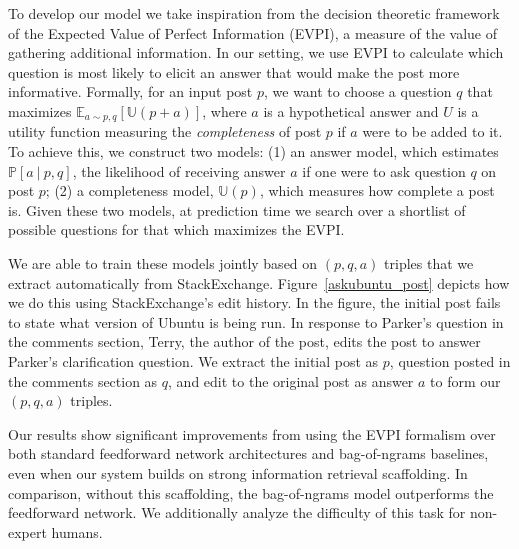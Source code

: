 \documentclass[11pt,a4paper]{article}
\newcommand{\U}{\mathbb{U}}
\begin{document}
To develop our model we take inspiration from the decision theoretic framework of the Expected Value of Perfect Information (EVPI), a measure of the value of gathering additional information. In our setting, we use EVPI to calculate which question is most likely to elicit an answer that would make the post more informative.
Formally, for an input post $p$, we want to choose a question $q$ that maximizes $\mathbb{E}_{a \sim p,q}[\U(p+a)]$, where $a$ is a hypothetical answer and $U$ is a utility function measuring the \emph{completeness} of post $p$ if $a$ were to be added to it.
To achieve this, we construct two models:
(1) an answer model, which estimates $\mathbb{P}[a~|~p,q]$, the likelihood of receiving answer $a$ if one were to ask question $q$ on post $p$;
(2) a completeness model, $\U(p)$, which measures how complete a post is.
Given these two models, at prediction time we search over a shortlist of possible questions for that which maximizes the EVPI.

We are able to train these models jointly based on $(p,q,a)$ triples that we extract automatically from StackExchange.
Figure~\ref{askubuntu_post} depicts how we do this using StackExchange's edit history.  In the figure, the initial post fails to state what version of Ubuntu is being run. In response to Parker's question in the comments section, Terry, the author of the post, edits the post to answer Parker's clarification question. We extract the initial post as $p$, question posted in the comments section as $q$, and edit to the original post as answer $a$ to form our $(p,q,a)$ triples. 

Our results show significant improvements from using the EVPI formalism over both standard feedforward network architectures and bag-of-ngrams baselines, even when our system builds on strong information retrieval scaffolding. In comparison, without this scaffolding, the bag-of-ngrams model outperforms the feedforward network. We additionally analyze the difficulty of this task for non-expert humans. 
\end{document}
